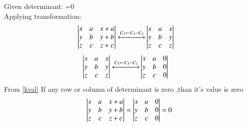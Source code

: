 Given determinant:
=0\\
Applying transformation:\\
\begin{align}
\begin{vmatrix}x & a & x+a\\
y & b & y+b\\
z &c &z+c\end{vmatrix}
\xleftrightarrow[]{C_3 \leftarrow C_3- C_2 } 
&
\begin{vmatrix}x & a & x\\
y & b & y\\
z &c &z\end{vmatrix}
\end{align}
\begin{align}
\begin{vmatrix}x & a & x\\
y & b & y\\
z &c &z\end{vmatrix}
\xleftrightarrow[]{C_3 \leftarrow C_3- C_1} 
&
\begin{vmatrix}x & a & 0\\
y & b & 0\\
z &c &0\end{vmatrix}
\label{kval}
\end{align}
From \ref{kval} If any row or column of determinant is zero ,than it's value is zero
\begin{align}
\begin{vmatrix}x & a & x+a\\
y & b & y+b\\
z &c &z+c\end{vmatrix}
=
\begin{vmatrix}x & a & 0\\
y & b & 0\\
z &c &0\end{vmatrix}=0
\end{align}

   
